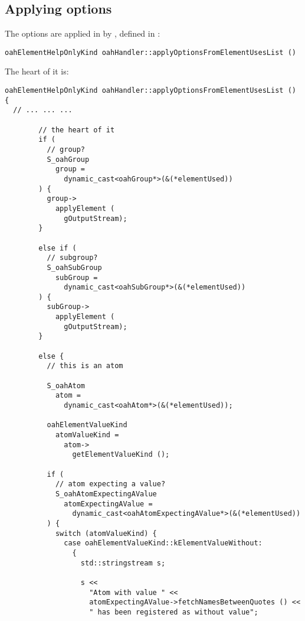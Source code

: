 {%
	\subsection{Applying options}

The options are applied in  by , defined in :
\begin{lstlisting}[language=CPlusPlus]
oahElementHelpOnlyKind oahHandler::applyOptionsFromElementUsesList ()
\end{lstlisting}

The heart of it is:
\begin{lstlisting}[language=CPlusPlus]
oahElementHelpOnlyKind oahHandler::applyOptionsFromElementUsesList ()
{
  // ... ... ...

        // the heart of it
        if (
          // group?
          S_oahGroup
            group =
              dynamic_cast<oahGroup*>(&(*elementUsed))
        ) {
          group->
            applyElement (
              gOutputStream);
        }

        else if (
          // subgroup?
          S_oahSubGroup
            subGroup =
              dynamic_cast<oahSubGroup*>(&(*elementUsed))
        ) {
          subGroup->
            applyElement (
              gOutputStream);
        }

        else {
          // this is an atom

          S_oahAtom
            atom =
              dynamic_cast<oahAtom*>(&(*elementUsed));

          oahElementValueKind
            atomValueKind =
              atom->
                getElementValueKind ();

          if (
            // atom expecting a value?
            S_oahAtomExpectingAValue
              atomExpectingAValue =
                dynamic_cast<oahAtomExpectingAValue*>(&(*elementUsed))
          ) {
            switch (atomValueKind) {
              case oahElementValueKind::kElementValueWithout:
                {
                  std::stringstream s;

                  s <<
                    "Atom with value " <<
                    atomExpectingAValue->fetchNamesBetweenQuotes () <<
                    " has been registered as without value";


\end{lstlisting}}
